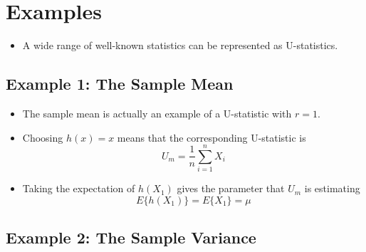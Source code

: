 \documentclass[]{book}
\providecommand{\tightlist}{%
  \setlength{\itemsep}{0pt}\setlength{\parskip}{0pt}}
\begin{document}
\hypertarget{examples}{%
\section{Examples}\label{examples}}

\begin{itemize}
\tightlist
\item
  A wide range of well-known statistics can be represented as U-statistics.
\end{itemize}

\hypertarget{example-1-the-sample-mean}{%
\subsection{Example 1: The Sample Mean}\label{example-1-the-sample-mean}}

\begin{itemize}
\item
  The sample mean is actually an example of a U-statistic with \(r = 1\).
\item
  Choosing \(h(x) = x\) means that the corresponding U-statistic is
  \begin{equation}
  U_{m} = \frac{1}{n} \sum_{i=1}^{n} X_{i} \nonumber
  \end{equation}
\item
  Taking the expectation of \(h(X_{1})\) gives the parameter that \(U_{m}\)
  is estimating
  \begin{equation}
  E\{ h(X_{1}) \} = E\{ X_{1} \} = \mu \nonumber
  \end{equation}
\end{itemize}

\hypertarget{example-2-the-sample-variance}{%
\subsection{Example 2: The Sample Variance}\label{example-2-the-sample-variance}}
\end{document}

